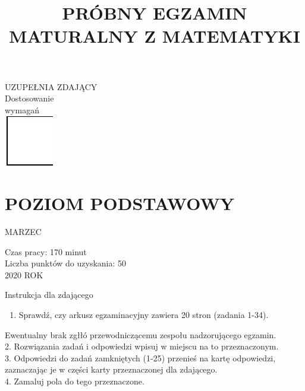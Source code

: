 \documentclass[10pt]{article}
\title{PRÓBNY EGZAMIN MATURALNY Z MATEMATYKI }
\author{}
\date{}
\begin{document}
\maketitle
UZUPEŁNIA ZDAJĄCY\\
Dostosowanie\\
wymagań\\
\includegraphics[max width=\textwidth, center]{2024_11_21_ba65d61981011633d840g-01(1)}

\section*{POZIOM PODSTAWOWY}
MARZEC

Czas pracy: 170 minut\\
Liczba punktów do uzyskania: 50\\
2020 ROK

Instrukcja dla zdającego

\begin{enumerate}
  \item Sprawdź, czy arkusz egzaminacyjny zawiera 20 stron (zadania 1-34).
\end{enumerate}

Ewentualny brak zgłłó przewodniczącemu zespołu nadzorującego egzamin.\\
2. Rozwiązania zadań i odpowiedzi wpisuj w miejscu na to przeznaczonym.\\
3. Odpowiedzi do zadań zamkniętych (1-25) przenieś na kartę odpowiedzi, zaznaczając je w części karty przeznaczonej dla zdającego.\\
4. Zamaluj pola do tego przeznaczone.
\end{document}
